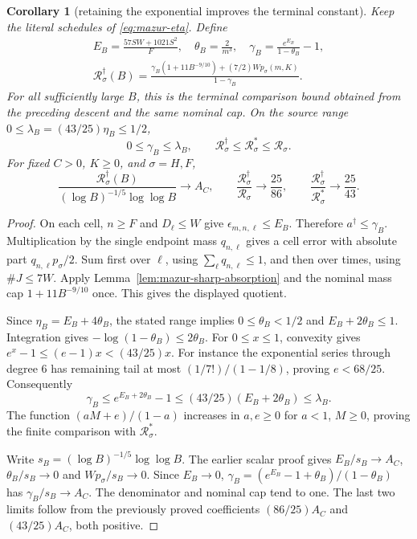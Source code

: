\documentclass[11pt]{article}
\newtheorem{corollary}[proposition]{Corollary}
\theoremstyle{remark}\newtheorem{remark}[proposition]{Remark}
\begin{document}
\begin{corollary}[retaining the exponential improves the terminal constant]
\label{cor:mazur-exponential-terminal}
Keep the literal schedules of \eqref{eq:mazur-eta}. Define
\begin{equation}
 \begin{gathered}
 E_B=\frac{57SW+1021S^2}{F},\quad
 \theta_B=\frac2{m^3},\quad
 \gamma_B=\frac{e^{E_B}}{1-\theta_B}-1,\\
 \mathcal R_\sigma^\dagger(B)=
 \frac{\gamma_B(1+11B^{-9/10})+(7/2)W p_\sigma(m,K)}
       {1-\gamma_B}.
 \end{gathered}
 \label{eq:mazur-exponential-terminal}
\end{equation}
For all sufficiently large $B$, this is the terminal comparison bound
obtained from the preceding descent and the same nominal cap.
On the source range $0\le\lambda_B=(43/25)\eta_B\le1/2$,
\[
 0\le\gamma_B\le\lambda_B,\qquad
 \mathcal R_\sigma^\dagger\le\mathcal R_\sigma^*\le\mathcal R_\sigma.
\]
For fixed $C>0$, $K\ge0$, and $\sigma=H,F$,
\[
 \frac{\mathcal R_\sigma^\dagger(B)}
      {(\log B)^{-1/5}\log\log B}\longrightarrow A_C,\qquad
 \frac{\mathcal R_\sigma^\dagger}{\mathcal R_\sigma}
       \longrightarrow\frac{25}{86},\qquad
 \frac{\mathcal R_\sigma^\dagger}{\mathcal R_\sigma^*}
       \longrightarrow\frac{25}{43}.
\]
\end{corollary}
\begin{proof}
On each cell, $n\ge F$ and $D_\ell\le W$ give
$\epsilon_{m,n,\ell}\le E_B$. Therefore $a^\dagger\le\gamma_B$.
Multiplication by the single endpoint mass $q_{n,\ell}$
gives a cell error with absolute part $q_{n,\ell}p_\sigma/2$.
Sum first over $\ell$, using $\sum_\ell q_{n,\ell}\le1$, and
then over times, using $\#J\le7W$.
Apply Lemma~\ref{lem:mazur-sharp-absorption} and the nominal mass
cap $1+11B^{-9/10}$ once. This gives the displayed quotient.

Since $\eta_B=E_B+4\theta_B$, the stated range implies
$0\le\theta_B<1/2$ and $E_B+2\theta_B\le1$.
Integration gives $-\log(1-\theta_B)\le2\theta_B$.
For $0\le x\le1$, convexity gives
$e^x-1\le(e-1)x<(43/25)x$. For instance the exponential series
through degree $6$ has remaining tail at most
$(1/7!)/(1-1/8)$, proving $e<68/25$.
Consequently
\[
 \gamma_B
 \le e^{E_B+2\theta_B}-1
 \le(43/25)(E_B+2\theta_B)\le\lambda_B.
\]
The function $(aM+e)/(1-a)$ increases in $a,e\ge0$ for $a<1$,
$M\ge0$, proving the finite comparison with $\mathcal R_\sigma^*$.

Write $s_B=(\log B)^{-1/5}\log\log B$. The earlier scalar proof gives
$E_B/s_B\to A_C$, $\theta_B/s_B\to0$ and $Wp_\sigma/s_B\to0$.
Since $E_B\to0$,
$\gamma_B=(e^{E_B}-1+\theta_B)/(1-\theta_B)$ has
$\gamma_B/s_B\to A_C$. The denominator and nominal cap tend to one.
The last two limits follow from the previously proved coefficients
$(86/25)A_C$ and $(43/25)A_C$, both positive.
\end{proof}
\end{document}

